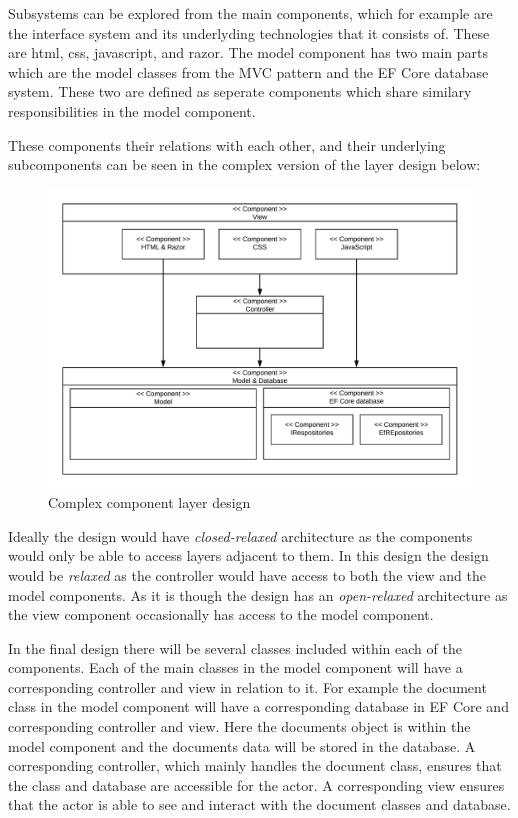 Subsystems can be explored from the main components, which for example are the interface system and its underlyding technologies that it consists of.
These are html, css, javascript, and razor.
The model component has two main parts which are the model classes from the MVC pattern and the EF Core database system.
These two are defined as seperate components which share similary responsibilities in the model component.

These components their relations with each other, and their underlying subcomponents can be seen in the complex version of the layer design below:

\begin{figure}[H]
	\centering
	\includegraphics[width=1\textwidth]{billeder/complexcomponents.jpeg}
	\caption{Complex component layer design}
\end{figure}

Ideally the design would have \textit{closed-relaxed} architecture as the components would only be able to access layers adjacent to them.
In this design the design would be \textit{relaxed} as the controller would have access to both the view and the model components.
As it is though the design has an \textit{open-relaxed} architecture as the view component occasionally has access to the model component.


In the final design there will be several classes included within each of the components.
Each of the main classes in the model component will have a corresponding controller and view in relation to it.
For example the document class in the model component will have a corresponding database in EF Core and corresponding controller and view.
Here the documents object is within the model component and the documents data will be stored in the database.
A corresponding controller, which mainly handles the document class, ensures that the class and database are accessible for the actor.
A corresponding view ensures that the actor is able to see and interact with the document classes and database.
